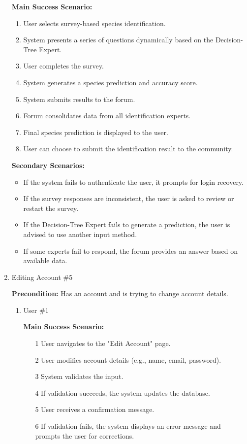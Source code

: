 \documentclass[]{article}
\begin{document}
\begin{enumerate}[{\bf BE1.}]
\textbf{Main Success Scenario:}
\begin{enumerate}
    \item User selects survey-based species identification.
    \item System presents a series of questions dynamically based on the Decision-Tree Expert.
    \item User completes the survey.
    \item System generates a species prediction and accuracy score.
    \item System submits results to the forum.
    \item Forum consolidates data from all identification experts.
    \item Final species prediction is displayed to the user.
    \item User can choose to submit the identification result to the community.
\end{enumerate}

\textbf{Secondary Scenarios:}
\begin{itemize}
    \item If the system fails to authenticate the user, it prompts for login recovery.
    \item If the survey responses are inconsistent, the user is asked to review or restart the survey.
    \item If the Decision-Tree Expert fails to generate a prediction, the user is advised to use another input method.
    \item If some experts fail to respond, the forum provides an answer based on available data.
\end{itemize}
\item Editing Account \#5
 
\textbf{Precondition:} Has an account and is trying to change account details.
 
\begin{enumerate}[{\bf VP1.}]
\item User \#1 \
 
    \textbf{Main Success Scenario:}
    \begin{enumerate}
        \item[1] User navigates to the "Edit Account" page.
        \item[2] User modifies account details (e.g., name, email, password).
        \item[3] System validates the input.
        \item[4] If validation succeeds, the system updates the database.
        \item[5] User receives a confirmation message.
        \item[6] If validation fails, the system displays an error message and prompts the user for corrections.
    \end{enumerate}
 

\end{enumerate}
\end{enumerate}
\end{document}

